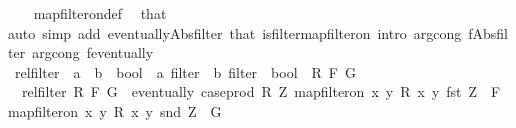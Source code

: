 \begin{isabellebody}
%
\isadelimproof
\ \ %
\endisadelimproof
%
\isatagproof
{}\isamarkupfalse%
\ map{\isacharunderscore}{\kern0pt}filter{\isacharunderscore}{\kern0pt}on{\isacharunderscore}{\kern0pt}def\ \isamarkupfalse%
\ that{\isacharparenleft}{\kern0pt}{}{\isacharparenright}{\kern0pt}\isanewline
\ \ \isamarkupfalse%
{\isacharparenleft}{\kern0pt}auto\ simp\ add{\isacharcolon}{\kern0pt}\ eventually{\isacharunderscore}{\kern0pt}Abs{\isacharunderscore}{\kern0pt}filter\ that{\isacharparenleft}{\kern0pt}{}{\isacharparenright}{\kern0pt}\ is{\isacharunderscore}{\kern0pt}filter{\isacharunderscore}{\kern0pt}map{\isacharunderscore}{\kern0pt}filter{\isacharunderscore}{\kern0pt}on\ intro{\isacharbang}{\kern0pt}{\isacharcolon}{\kern0pt}\ arg{\isacharunderscore}{\kern0pt}cong{\isacharbrackleft}{\kern0pt}\ f{\isacharequal}{\kern0pt}Abs{\isacharunderscore}{\kern0pt}filter{\isacharbrackright}{\kern0pt}\ arg{\isacharunderscore}{\kern0pt}cong{}{\isacharbrackleft}{\kern0pt}\ f{\isacharequal}{\kern0pt}eventually{\isacharbrackright}{\kern0pt}{\isacharparenright}{\kern0pt}%
\endisatagproof
{\isafoldproof}%
%
\isadelimproof
\isanewline
%
\endisadelimproof
\isanewline
{}\isamarkupfalse%
\ rel{\isacharunderscore}{\kern0pt}filter\ {\isacharcolon}{\kern0pt}{\isacharcolon}{\kern0pt}\ {\isachardoublequoteopen}{\isacharparenleft}{\kern0pt}{\isacharprime}{\kern0pt}a\ {\isasymRightarrow}\ {\isacharprime}{\kern0pt}b\ {\isasymRightarrow}\ bool{\isacharparenright}{\kern0pt}\ {\isasymRightarrow}\ {\isacharprime}{\kern0pt}a\ filter\ {\isasymRightarrow}\ {\isacharprime}{\kern0pt}b\ filter\ {\isasymRightarrow}\ bool{\isachardoublequoteclose}\ \ R\ F\ G\ \isanewline
\ \ {\isachardoublequoteopen}rel{\isacharunderscore}{\kern0pt}filter\ R\ F\ G{\isachardoublequoteclose}\ \ {\isachardoublequoteopen}eventually\ {\isacharparenleft}{\kern0pt}case{\isacharunderscore}{\kern0pt}prod\ R{\isacharparenright}{\kern0pt}\ Z{\isachardoublequoteclose}\ {\isachardoublequoteopen}map{\isacharunderscore}{\kern0pt}filter{\isacharunderscore}{\kern0pt}on\ {\isacharbraceleft}{\kern0pt}{\isacharparenleft}{\kern0pt}x{\isacharcomma}{\kern0pt}\ y{\isacharparenright}{\kern0pt}{\isachardot}{\kern0pt}\ R\ x\ y{\isacharbraceright}{\kern0pt}\ fst\ Z\ {\isacharequal}{\kern0pt}\ F{\isachardoublequoteclose}\ {\isachardoublequoteopen}map{\isacharunderscore}{\kern0pt}filter{\isacharunderscore}{\kern0pt}on\ {\isacharbraceleft}{\kern0pt}{\isacharparenleft}{\kern0pt}x{\isacharcomma}{\kern0pt}\ y{\isacharparenright}{\kern0pt}{\isachardot}{\kern0pt}\ R\ x\ y{\isacharbraceright}{\kern0pt}\ snd\ Z\ {\isacharequal}{\kern0pt}\ G{\isachardoublequoteclose}\isanewline

\end{isabellebody}
